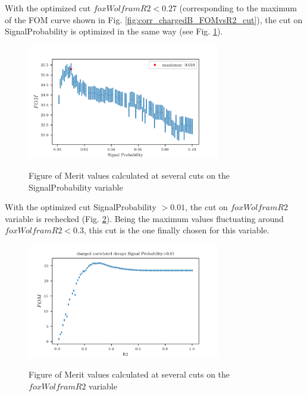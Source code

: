 With the optimized cut $foxWolframR2 < 0.27$ (corresponding to the maximum of the FOM curve shown in Fig. \ref{fig:corr_chargedB_FOMvsR2_cut}), the cut on SignalProbability is optimized in the same way (see Fig. \ref{fig:corr_chargedB_FOMvsSigProb_cut}).


\begin{figure}[h!]
{\includegraphics[width=0.75\textwidth]{04-chargedCorrBtoLambda/figs/corr_chargedB_FOMvsSigProb_cut.png}}
\caption{Figure of Merit values calculated at several cuts on the SignalProbability variable}
\label{fig:corr_chargedB_FOMvsSigProb_cut}
\end{figure}

With the optimized cut SignalProbability $ > 0.01$, the cut on $foxWolframR2$ variable is rechecked (Fig. \ref{fig:corr_chargedB_FOMvsR2_cut_SigProbOpt}). Being the maximum values fluctuating around $foxWolframR2 < 0.3$, this cut is the one finally chosen for this variable.   

\begin{figure}[h!]
{\includegraphics[width=0.75\textwidth]{04-chargedCorrBtoLambda/figs/corr_chargedB_FOMvsR2_cut_SigProbOpt.png}}
\caption{Figure of Merit values calculated at several cuts on the $foxWolframR2$ variable}
\label{fig:corr_chargedB_FOMvsR2_cut_SigProbOpt}
\end{figure}

